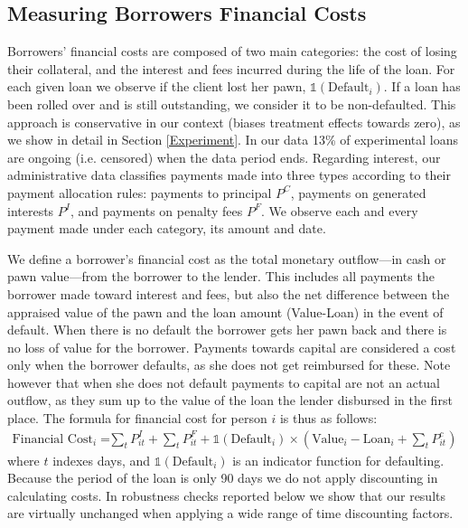 \documentclass[12pt, a4paper]{article}
\begin{document}
    
\subsection{Measuring Borrowers Financial Costs} 
\label{costs}
    
Borrowers' financial costs are composed of two main categories: the cost of losing their collateral, and the interest and fees incurred during the life of the loan. For each given loan we observe if the client lost her pawn, $\mathds{1}(\text{Default}_i)$. If a loan has been rolled over and is still outstanding, we consider it to be non-defaulted.  This approach is conservative in our context (biases treatment effects towards zero), as we show in detail in Section \ref{Experiment}. In our data 13\% of experimental loans are ongoing (i.e. censored) when the data period ends. Regarding interest, our administrative data classifies payments made into three types according to their payment allocation rules: payments to principal $P^C$, payments on generated interests $P^I$, and payments on penalty fees $P^F$. We observe each and every payment made under each category, its amount and date. 

We define a borrower's financial cost as the total monetary outflow---in cash or pawn value---from the borrower to the lender. This includes all payments the borrower made toward interest and fees, but also the net difference between the appraised value of the pawn and the loan amount (Value-Loan) in the event of default. When there is no default the borrower gets her pawn back and there is no loss of value for the borrower. Payments towards capital are considered a cost only when the borrower defaults, as she does not get reimbursed for these. Note however that when she does not default payments to capital are not an actual outflow, as they sum up to the value of the loan the lender disbursed in the first place. The formula for financial cost for person $i$ is thus as follows: %
\begin{align*}
    \text{Financial Cost}_i =&  \sum_t P^I_{it} +\sum_t P^F_{it}  
     + \mathds{1}(\text{Default}_i) \times \left(\text{Value}_i-\text{Loan}_i + \sum_t P^c_{it}\right)
\end{align*}
where $t$ indexes days, and $\mathds{1}(\text{Default}_i)$ is an indicator function for defaulting. Because the period of the loan is only 90 days we do not apply discounting in calculating costs.  In robustness checks reported below we show that our results are virtually unchanged when applying a wide range of time discounting factors.
\end{document}
